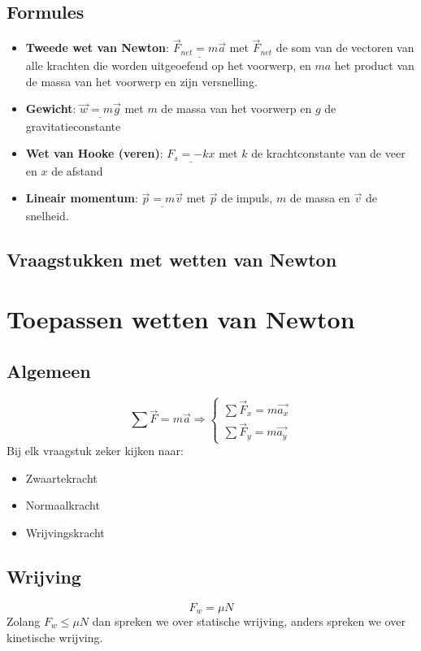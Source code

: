 \documentclass[12pt]{report}
\newcommand{\important}[1] {\textbf{\color{orange}#1}}
\begin{document}
\section{Formules}
\begin{itemize}
  \item {\important{Tweede wet van Newton}: 
  $\underline{\overrightarrow{F}_{net} = m\overrightarrow{a}}$ met $\overrightarrow{F}_{net}$ de som van de vectoren van alle krachten die worden uitgeoefend 
  op het voorwerp, en $ma$ het product van de massa van het voorwerp en zijn versnelling.}
  \item {\important{Gewicht}: $\underline{\overrightarrow{w} = m\overrightarrow{g}}$ met $m$ de massa van het voorwerp en $g$ de gravitatieconstante}
  \item {\important{Wet van Hooke (veren)}: $\underline{F_{s} = -kx}$ met $k$ de krachtconstante van de veer en $x$ de afstand}
  \item {\important{Lineair momentum}: 
  $\underline{\overrightarrow{p} = m\overrightarrow{v}}$ 
  met $\overrightarrow{p}$ de impuls, $m$ de massa en $\overrightarrow{v}$ de snelheid.
  }
\end{itemize}

\section{Vraagstukken met wetten van Newton}

\chapter{Toepassen wetten van Newton}
\section{Algemeen}
$$\sum \overrightarrow{F} = m\overrightarrow{a} \Rightarrow 
\begin{cases}
  \sum \overrightarrow{F}_x = m\overrightarrow{a_x} \\
  \sum \overrightarrow{F}_y = m\overrightarrow{a_y} 
 \end{cases}
$$
Bij elk vraagstuk zeker kijken naar:
\begin{itemize}
 \item Zwaartekracht
 \item Normaalkracht
 \item Wrijvingskracht
\end{itemize}


\section{Wrijving}
$$ F_{w} = \mu N$$
Zolang $F_w \leq \mu N$ dan spreken  we over statische wrijving, anders spreken we over kinetische wrijving.
\end{document}
